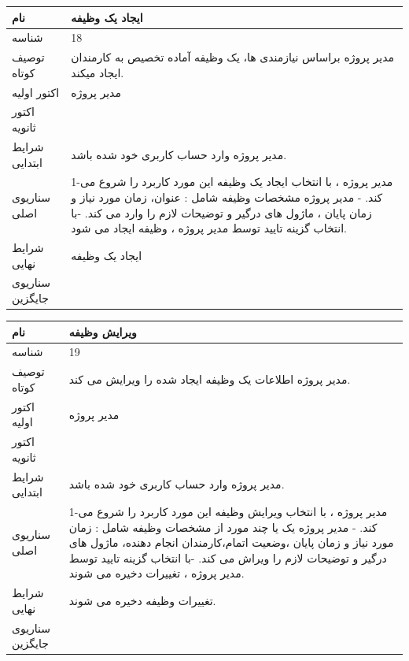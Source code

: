 \documentclass{article}
\begin{document}
\vspace{2cm}

\begin{tabular}{|p{2cm}|p{10cm}|}
\hline
نام
&
ایجاد یک وظیفه
\\
\hline
شناسه
&
18
\\
\hline
توصیف کوتاه
&
مدیر پروژه براساس نیازمندی ها، یک وظیفه آماده تخصیص به کارمندان ایجاد میکند.
\\
\hline
اکتور اولیه
&
مدیر پروژه
\\
\hline
اکتور ثانویه
&

\\
\hline
شرایط ابتدایی
&
مدیر پروژه وارد حساب کاربری خود شده باشد. 
\\
\hline
سناریوی اصلی
&
1-مدیر پروژه ، با انتخاب ایجاد یک وظیفه  این مورد کاربرد را شروع می کند.
\newline
2- مدیر پروژه مشخصات وظیفه شامل : عنوان، زمان مورد نیاز و زمان پایان ، ماژول های درگیر و توضیحات لازم را وارد می کند. 
\newline
3-با انتخاب گزینه تایید توسط مدیر پروژه ، وظیفه ایجاد می شود.
\\
\hline
شرایط نهایی
&
ایجاد یک وظیفه
\\
\hline
سناریوی جایگزین
&

\\
\hline
\end{tabular}

\vspace{2cm}

\begin{tabular}{|p{2cm}|p{10cm}|}
\hline
نام
&
ویرایش وظیفه
\\
\hline
شناسه
&
19
\\
\hline
توصیف کوتاه
&
مدیر پروژه اطلاعات یک وظیفه ایجاد شده را ویرایش می کند. 
\\
\hline
اکتور اولیه
&
مدیر پروژه
\\
\hline
اکتور ثانویه
&

\\
\hline
شرایط ابتدایی
&
مدیر پروژه وارد حساب کاربری خود شده باشد. 
\\
\hline
سناریوی اصلی
&
1-مدیر پروژه ، با انتخاب ویرایش وظیفه  این مورد کاربرد را شروع می کند.
\newline
2- مدیر پروژه یک یا چند مورد از مشخصات وظیفه شامل : زمان مورد نیاز و زمان پایان ،وضعیت اتمام،کارمندان انجام دهنده،  ماژول های درگیر و توضیحات لازم را ویراش می کند. 
\newline
3-با انتخاب گزینه تایید توسط مدیر پروژه ، تغییرات دخیره می شوند.
\\
\hline
شرایط نهایی
&
تغییرات وظیفه دخیره می شوند.
\\
\hline
سناریوی جایگزین
&

\\
\hline
\end{tabular}
\end{document}
